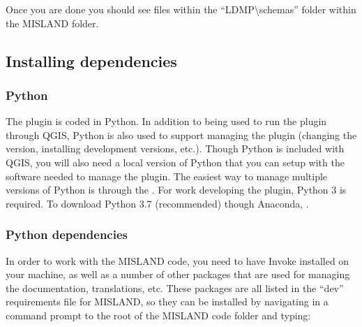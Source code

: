 \documentclass[letterpaper,10pt,english]{sphinxmanual}
\begin{document}
\begin{sphinxVerbatim}[commandchars=\\\{\}]
  
  
\end{sphinxVerbatim}

\sphinxAtStartPar
Once you are done you should see files within the “LDMP\textbackslash{}schemas” folder within
the MISLAND folder.


\subsection{Installing dependencies}
\label{\detokenize{Qgis_Plugin/plugin_development:installing-dependencies}}

\subsubsection{Python}
\label{\detokenize{Qgis_Plugin/plugin_development:python}}
\sphinxAtStartPar
The plugin is coded in Python. In addition to being used to run the plugin
through QGIS, Python is also used to support managing the plugin (changing the
version, installing development versions, etc.). Though Python is included with
QGIS, you will also need a local version of Python that you can setup with the
software needed to manage the plugin. The easiest way to manage multiple
versions of Python is through the . For work developing the plugin, Python
3 is required. To download Python 3.7 (recommended) though Anaconda,
.


\subsubsection{Python dependencies}
\label{\detokenize{Qgis_Plugin/plugin_development:python-dependencies}}
\sphinxAtStartPar
In order to work with the MISLAND code, you need to have Invoke
installed on your machine, as well as a number of other packages that are used
for managing the documentation, translations, etc. These packages are all
listed in the “dev” requirements file for MISLAND, so they can be
installed by navigating in a command prompt to the root of the MISLAND
code folder and typing:

\begin{sphinxVerbatim}[commandchars=\\\{\}]
   
\end{sphinxVerbatim}
\end{document}
